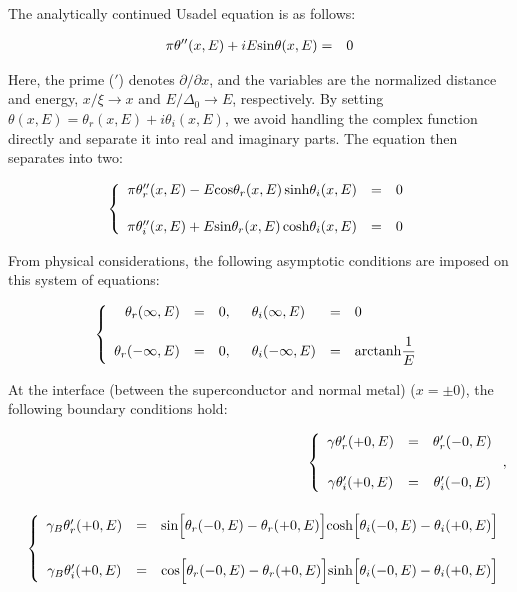 \documentclass[uplatex,a4j,12pt,dvipdfmx]{jsarticle}
\begin{document}
The analytically continued Usadel equation is as follows:

\begin{eqnarray}
	\pi
	\theta''(x,E)
	+
	i E {\rm sin} \theta(x,E)
	&=&
	0
\end{eqnarray}

Here, the prime ($'$) denotes $\partial/\partial x$,
and the variables are the normalized distance and energy,
$x/ \xi \to x$ and $ E/\Delta_{0} \to E $, respectively.
By setting
$\theta(x,E) = \theta_{r}(x,E) +i \theta_{i}(x,E)$,
we avoid handling the complex function directly and separate it into real and imaginary parts.
The equation then separates into two:

\begin{eqnarray}
	\left\{
	\begin{array}{rcl}
		\pi \theta_{r}''(x,E)
		-
		E {\rm cos} \theta_{r}(x,E) \ \! {\rm sinh} \theta_{i}(x,E)
		 & = &
		0
		\\[5mm]
		\pi \theta_{i}''(x,E)
		+
		E {\rm sin} \theta_{r}(x,E) \ \! {\rm cosh} \theta_{i}(x,E)
		 & = &
		0
	\end{array}
	\right.
\end{eqnarray}

From physical considerations, the following asymptotic conditions
are imposed on this system of equations:

\begin{eqnarray}
	\left\{
	\begin{array}{rclll}
		\theta_{r}(\infty,E)
		                                     & = &
		0
		, \hspace{5mm} \theta_{i}(\infty,E)  &
		=                                    &
		0
		\\[4mm]
		\theta_{r}(-\infty,E)
		                                     & = &
		0
		, \hspace{5mm} \theta_{i}(-\infty,E) &
		=
		                                     &
		{\rm arctanh} \dfrac{1}{ E }
	\end{array}
	\right.
\end{eqnarray}

At the interface (between the superconductor and normal metal)
($x=\pm0$), the following boundary conditions hold:

\begin{eqnarray}
	&&
	\left\{
	\begin{array}{clc}
		\gamma
		\theta_{r}'(+0,E)
		 & = &
		\theta_{r}'(-0,E)
		\\[6mm]
		\gamma
		\theta_{i}'(+0,E)
		 & = &
		\theta_{i}'(-0,E)
	\end{array}
	\right.
	,
	\\[4mm]
	&&
	\left\{
	\begin{array}{clc}
		\gamma_{B}
		\theta_{r}'(+0,E)
		 & = &
		{\rm sin} \Big[ \theta_{r}(-0,E) - \theta_{r}(+0,E) \Big]
		{\rm cosh} \Big[ \theta_{i}(-0,E) - \theta_{i}(+0,E) \Big]
		\\[6mm]
		\gamma_{B}
		\theta_{i}'(+0,E)
		 & = &
		{\rm cos} \Big[ \theta_{r}(-0,E) - \theta_{r}(+0,E) \Big]
		{\rm sinh} \Big[ \theta_{i}(-0,E) - \theta_{i}(+0,E) \Big]
	\end{array}
	\right.
\end{eqnarray}
\end{document}

